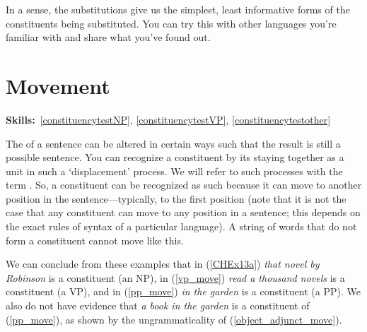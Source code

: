 \documentclass{article}
\begin{document}
In a sense, the substitutions give us the simplest, least informative forms of the constituents being substituted. You can try this with other languages you're familiar with and share what you've found out.

\section{Movement}
\hfill{}\textbf{Skills:}~\ref{constituencytestNP},
\ref{constituencytestVP},
\ref{constituencytestother}

The  of a sentence can be altered in certain ways such that the result is still a possible sentence.
You can recognize a constituent by its staying together as a unit in such a `displacement' process.
We will refer to such processes with the term .
So, a constituent can be recognized as such because it can move to another position in the sentence---typically, to the first position (note that it is not the case that any constituent can move to any position in a sentence; this depends on the exact rules of syntax of a particular language).
A string of words that do not form a constituent cannot move like this.
\begin{exe}
\end{exe}

We can conclude from these examples that in (\ref{CHEx13a}) \emph{that novel by Robinson} is a constituent (an NP), in (\ref{vp_move}) \emph{read a thousand novels} is a constituent (a VP), and in (\ref{pp_move}) \emph{in the garden} is a constituent (a PP).
We also do not have evidence that \emph{a book in the garden} is a constituent of (\ref{pp_move}), as shown by the ungrammaticality of (\ref{object_adjunct_move}).
\end{document}

